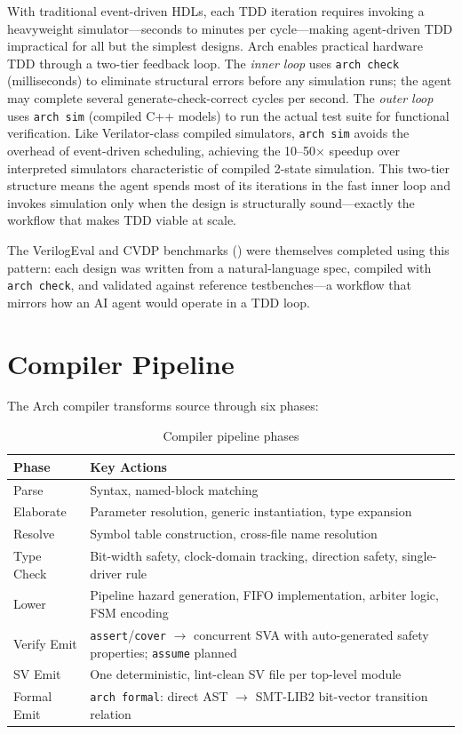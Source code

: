 \documentclass[manuscript]{acmart}
\begin{document}
With traditional event-driven HDLs, each TDD iteration requires invoking a heavyweight simulator---seconds to minutes per cycle---making agent-driven TDD impractical for all but the simplest designs. Arch enables practical hardware TDD through a two-tier feedback loop. The \emph{inner loop} uses \texttt{arch check} (milliseconds) to eliminate structural errors before any simulation runs; the agent may complete several generate-check-correct cycles per second. The \emph{outer loop} uses \texttt{arch sim} (compiled C++ models) to run the actual test suite for functional verification. Like Verilator-class compiled simulators, \texttt{arch sim} avoids the overhead of event-driven scheduling, achieving the 10--50$\times$ speedup over interpreted simulators characteristic of compiled 2-state simulation. This two-tier structure means the agent spends most of its iterations in the fast inner loop and invokes simulation only when the design is structurally sound---exactly the workflow that makes TDD viable at scale.

The VerilogEval and CVDP benchmarks () were themselves completed using this pattern: each design was written from a natural-language spec, compiled with \texttt{arch check}, and validated against reference testbenches---a workflow that mirrors how an AI agent would operate in a TDD loop.

\section{Compiler Pipeline}\label{sec:compiler}

The Arch compiler transforms source through six phases:

\begin{table}[H]
\centering
\caption{Compiler pipeline phases}
\label{tab:compiler}
\small
\begin{tabular}{@{}lp{5cm}@{}}
\toprule
\textbf{Phase} & \textbf{Key Actions} \\
\midrule
Parse & Syntax, named-block matching \\
Elaborate & Parameter resolution, generic instantiation, type expansion \\
Resolve & Symbol table construction, cross-file name resolution \\
Type Check & Bit-width safety, clock-domain tracking, direction safety, single-driver rule \\
Lower & Pipeline hazard generation, FIFO implementation, arbiter logic, FSM encoding \\
Verify Emit & \texttt{assert}/\texttt{cover} $\to$ concurrent SVA with auto-generated safety properties; \texttt{assume} planned \\
SV Emit & One deterministic, lint-clean SV file per top-level module \\
Formal Emit & \texttt{arch formal}: direct AST $\to$ SMT-LIB2 bit-vector transition relation \\
\bottomrule
\end{tabular}
\end{table}
\end{document}
